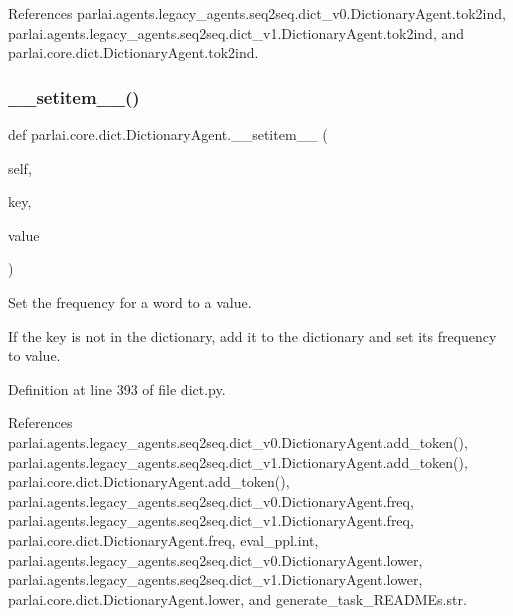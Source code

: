 References parlai.\+agents.\+legacy\+\_\+agents.\+seq2seq.\+dict\+\_\+v0.\+Dictionary\+Agent.\+tok2ind, parlai.\+agents.\+legacy\+\_\+agents.\+seq2seq.\+dict\+\_\+v1.\+Dictionary\+Agent.\+tok2ind, and parlai.\+core.\+dict.\+Dictionary\+Agent.\+tok2ind.

\mbox{\label{classparlai_1_1core_1_1dict_1_1DictionaryAgent_a43dfd6220ded966731b62bca37333dec}} 
\subsubsection{\texorpdfstring{\+\_\+\+\_\+setitem\+\_\+\+\_\+()}{\_\_setitem\_\_()}}
{\footnotesize\ttfamily def parlai.\+core.\+dict.\+Dictionary\+Agent.\+\_\+\+\_\+setitem\+\_\+\+\_\+ (\begin{DoxyParamCaption}\item[{}]{self,  }\item[{}]{key,  }\item[{}]{value }\end{DoxyParamCaption})}

\begin{DoxyVerb}Set the frequency for a word to a value.

If the key is not in the dictionary, add it to the dictionary and set
its frequency to value.
\end{DoxyVerb}
 

Definition at line 393 of file dict.\+py.



References parlai.\+agents.\+legacy\+\_\+agents.\+seq2seq.\+dict\+\_\+v0.\+Dictionary\+Agent.\+add\+\_\+token(), parlai.\+agents.\+legacy\+\_\+agents.\+seq2seq.\+dict\+\_\+v1.\+Dictionary\+Agent.\+add\+\_\+token(), parlai.\+core.\+dict.\+Dictionary\+Agent.\+add\+\_\+token(), parlai.\+agents.\+legacy\+\_\+agents.\+seq2seq.\+dict\+\_\+v0.\+Dictionary\+Agent.\+freq, parlai.\+agents.\+legacy\+\_\+agents.\+seq2seq.\+dict\+\_\+v1.\+Dictionary\+Agent.\+freq, parlai.\+core.\+dict.\+Dictionary\+Agent.\+freq, eval\+\_\+ppl.\+int, parlai.\+agents.\+legacy\+\_\+agents.\+seq2seq.\+dict\+\_\+v0.\+Dictionary\+Agent.\+lower, parlai.\+agents.\+legacy\+\_\+agents.\+seq2seq.\+dict\+\_\+v1.\+Dictionary\+Agent.\+lower, parlai.\+core.\+dict.\+Dictionary\+Agent.\+lower, and generate\+\_\+task\+\_\+\+R\+E\+A\+D\+M\+Es.\+str.

